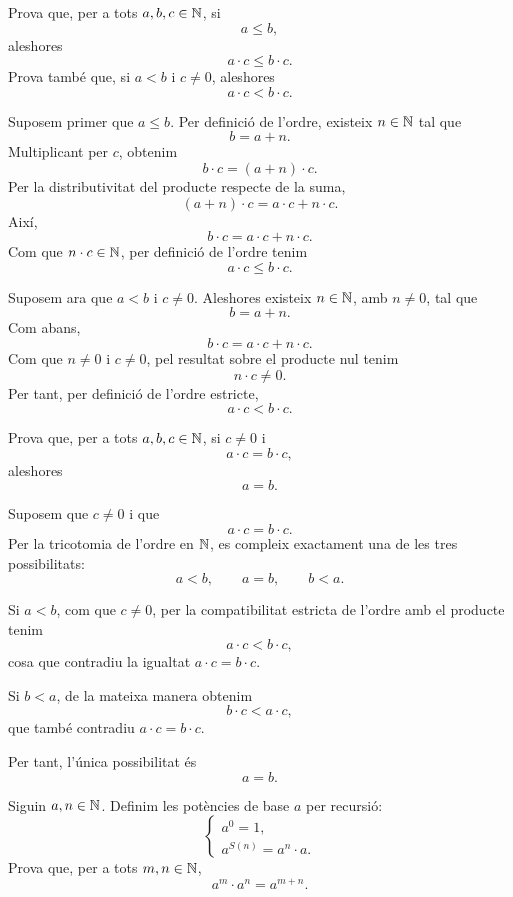 \begin{exercici}
Prova que, per a tots \(a,b,c\in\mathbb{N}\), si
\[
a\leq b,
\]
aleshores
\[
a\cdot c\leq b\cdot c.
\]
Prova també que, si \(a<b\) i \(c\neq 0\), aleshores
\[
a\cdot c<b\cdot c.
\]
\end{exercici}

\begin{solucio}
Suposem primer que \(a\leq b\). Per definició de l'ordre, existeix \(n\in\mathbb{N}\) tal que
\[
b=a+n.
\]
Multiplicant per \(c\), obtenim
\[
b\cdot c=(a+n)\cdot c.
\]
Per la distributivitat del producte respecte de la suma,
\[
(a+n)\cdot c=a\cdot c+n\cdot c.
\]
Així,
\[
b\cdot c=a\cdot c+n\cdot c.
\]
Com que \(n\cdot c\in\mathbb{N}\), per definició de l'ordre tenim
\[
a\cdot c\leq b\cdot c.
\]

Suposem ara que \(a<b\) i \(c\neq 0\). Aleshores existeix \(n\in\mathbb{N}\), amb \(n\neq 0\), tal que
\[
b=a+n.
\]
Com abans,
\[
b\cdot c=a\cdot c+n\cdot c.
\]
Com que \(n\neq0\) i \(c\neq0\), pel resultat sobre el producte nul tenim
\[
n\cdot c\neq0.
\]
Per tant, per definició de l'ordre estricte,
\[
a\cdot c<b\cdot c.
\]
\end{solucio}

\begin{exercici}
Prova que, per a tots \(a,b,c\in\mathbb{N}\), si \(c\neq0\) i
\[
a\cdot c=b\cdot c,
\]
aleshores
\[
a=b.
\]
\end{exercici}

\begin{solucio}
Suposem que \(c\neq0\) i que
\[
a\cdot c=b\cdot c.
\]
Per la tricotomia de l'ordre en \(\mathbb{N}\), es compleix exactament una de les tres possibilitats:
\[
a<b,\qquad a=b,\qquad b<a.
\]

Si \(a<b\), com que \(c\neq0\), per la compatibilitat estricta de l'ordre amb el producte tenim
\[
a\cdot c<b\cdot c,
\]
cosa que contradiu la igualtat \(a\cdot c=b\cdot c\).

Si \(b<a\), de la mateixa manera obtenim
\[
b\cdot c<a\cdot c,
\]
que també contradiu \(a\cdot c=b\cdot c\).

Per tant, l'única possibilitat és
\[
a=b.
\]
\end{solucio}

\begin{exercici}
Siguin \(a,n\in\mathbb{N}\). Definim les potències de base \(a\) per recursió:
\[
\left\{
\begin{array}{l}
a^0=1,\\
a^{S(n)}=a^n\cdot a.
\end{array}
\right.
\]
Prova que, per a tots \(m,n\in\mathbb{N}\),
\[
a^m\cdot a^n=a^{m+n}.
\]
\end{exercici}

